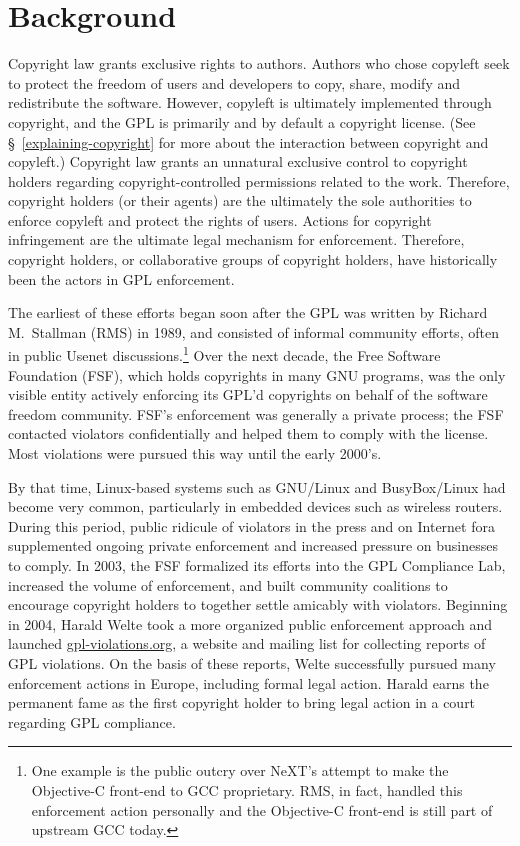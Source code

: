 \chapter{Background}

Copyright law grants exclusive rights to authors.  Authors who chose copyleft
seek to protect the freedom of users and developers to copy, share, modify
and redistribute the software.  However, copyleft is ultimately implemented
through copyright, and the GPL is primarily and by default a copyright
license.  (See \S~\ref{explaining-copyright} for more about the interaction
between copyright and copyleft.)  Copyright law grants an unnatural exclusive
control to copyright holders regarding copyright-controlled permissions
related to the work.  Therefore, copyright holders (or their agents) are the
ultimately the sole authorities to enforce copyleft and protect the rights of
users.  Actions for copyright infringement are the ultimate legal mechanism
for enforcement.  Therefore, copyright holders, or collaborative groups of
copyright holders, have historically been the actors in GPL enforcement.

The earliest of these efforts began soon after the GPL was written by
Richard M.~Stallman (RMS) in 1989, and consisted of informal community efforts,
often in public Usenet discussions.\footnote{One example is the public
  outcry over NeXT's attempt to make the Objective-C front-end to GCC
  proprietary.  RMS, in fact, handled this enforcement action personally and
  the Objective-C front-end is still part of upstream GCC today.}  Over the next decade, the Free Software Foundation (FSF),
which holds copyrights in many GNU programs, was the only visible entity
actively enforcing its GPL'd copyrights on behalf of the software freedom
community.
FSF's enforcement
was generally a private process; the FSF contacted violators
confidentially and helped them to comply with the license.  Most
violations were pursued this way until the early 2000's.

By that time, Linux-based systems such as GNU/Linux and BusyBox/Linux had become very common, particularly in
embedded devices such as wireless routers.  During this period, public
ridicule of violators in the press and on Internet fora supplemented
ongoing private enforcement and increased pressure on businesses to
comply.  In 2003, the FSF formalized its efforts into the GPL Compliance
Lab, increased the volume of enforcement, and built community coalitions
to encourage copyright holders to together settle amicably with violators.
Beginning in 2004, Harald Welte took a more organized public enforcement
approach and launched \href{http://gpl-violations.org/}{gpl-violations.org}, a website and mailing
list for collecting reports of GPL violations.  On the basis of these
reports, Welte successfully pursued many enforcement actions in Europe, including
formal legal action.  Harald earns the permanent fame as the first copyright
holder to bring legal action in a court regarding GPL compliance.

